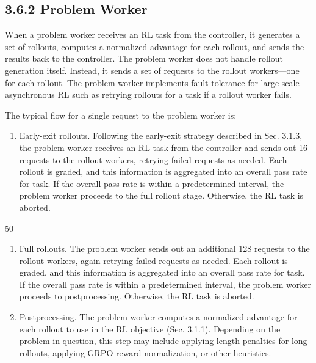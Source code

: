 \documentclass[
  10
]{article}
\providecommand{\tightlist}{%
  \setlength{\itemsep}{0pt}\setlength{\parskip}{0pt}}
\begin{document}
\subsection{3.6.2 Problem Worker}\label{problem-worker}

When a problem worker receives an RL task from the controller, it
generates a set of rollouts, computes a normalized advantage for each
rollout, and sends the results back to the controller. The problem
worker does not handle rollout generation itself. Instead, it sends a
set of requests to the rollout workers---one for each rollout. The
problem worker implements fault tolerance for large scale asynchronous
RL such as retrying rollouts for a task if a rollout worker fails.

The typical flow for a single request to the problem worker is:

\begin{enumerate}
\def\labelenumi{\arabic{enumi}.}
\tightlist
\item
  Early-exit rollouts. Following the early-exit strategy described in
  Sec. 3.1.3, the problem worker receives an RL task from the controller
  and sends out 16 requests to the rollout workers, retrying failed
  requests as needed. Each rollout is graded, and this information is
  aggregated into an overall pass rate for task. If the overall pass
  rate is within a predetermined interval, the problem worker proceeds
  to the full rollout stage. Otherwise, the RL task is aborted.
\end{enumerate}

50

\begin{enumerate}
\def\labelenumi{\arabic{enumi}.}
\setcounter{enumi}{1}
\item
  Full rollouts. The problem worker sends out an additional 128 requests
  to the rollout workers, again retrying failed requests as needed. Each
  rollout is graded, and this information is aggregated into an overall
  pass rate for task. If the overall pass rate is within a predetermined
  interval, the problem worker proceeds to postprocessing. Otherwise,
  the RL task is aborted.
\item
  Postprocessing. The problem worker computes a normalized advantage for
  each rollout to use in the RL objective (Sec. 3.1.1). Depending on the
  problem in question, this step may include applying length penalties
  for long rollouts, applying GRPO reward normalization, or other
  heuristics.
\end{enumerate}
\end{document}
